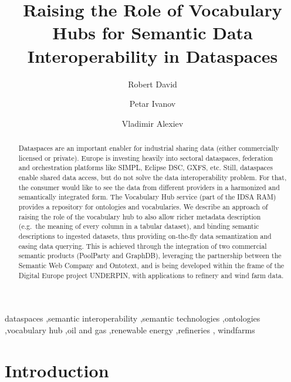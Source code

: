 \documentclass[
  super,
  preprint,
  3p]{elsarticle}
\begin{document}
\begin{frontmatter}
\title{Raising the Role of Vocabulary Hubs for Semantic Data
Interoperability in Dataspaces}
\author[1]{Robert David%
%
}
\author[2]{Petar Ivanov%
%
}
\author[2]{Vladimir Alexiev%
%
}





        
\begin{abstract}
Dataspaces are an important enabler for industrial sharing data (either
commercially licensed or private). Europe is investing heavily into
sectoral dataspaces, federation and orchestration platforms like SIMPL,
Eclipse DSC, GXFS, etc. Still, dataspaces enable shared data access, but
do not solve the data interoperability problem. For that, the consumer
would like to see the data from different providers in a harmonized and
semantically integrated form. The Vocabulary Hub service (part of the
IDSA RAM) provides a repository for ontologies and vocabularies. We
describe an approach of raising the role of the vocabulary hub to also
allow richer metadata description (e.g.~the meaning of every column in a
tabular dataset), and binding semantic descriptions to ingested
datasets, thus providing on-the-fly data semantization and easing data
querying. This is achieved through the integration of two commercial
semantic products (PoolParty and GraphDB), leveraging the partnership
between the Semantic Web Company and Ontotext, and is being developed
within the frame of the Digital Europe project UNDERPIN, with
applications to refinery and wind farm data.
\end{abstract}





\begin{keyword}
    dataspaces \sep semantic interoperability \sep semantic
technologies \sep ontologies \sep vocabulary hub \sep oil and
gas \sep renewable energy \sep refineries \sep 
    windfarms
\end{keyword}
\end{frontmatter}
    
\section{Introduction}\label{introduction}
\end{document}
